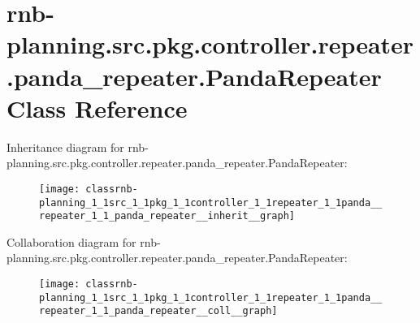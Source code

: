 \hypertarget{classrnb-planning_1_1src_1_1pkg_1_1controller_1_1repeater_1_1panda__repeater_1_1_panda_repeater}{}\section{rnb-\/planning.src.\+pkg.\+controller.\+repeater.\+panda\+\_\+repeater.\+Panda\+Repeater Class Reference}
\label{classrnb-planning_1_1src_1_1pkg_1_1controller_1_1repeater_1_1panda__repeater_1_1_panda_repeater}


Inheritance diagram for rnb-\/planning.src.\+pkg.\+controller.\+repeater.\+panda\+\_\+repeater.\+Panda\+Repeater\+:\nopagebreak
\begin{figure}[H]
\begin{center}
\leavevmode
\texttt{[image: classrnb-planning\_1\_1src\_1\_1pkg\_1\_1controller\_1\_1repeater\_1\_1panda\_\_repeater\_1\_1\_panda\_repeater\_\_inherit\_\_graph]}
\end{center}
\end{figure}


Collaboration diagram for rnb-\/planning.src.\+pkg.\+controller.\+repeater.\+panda\+\_\+repeater.\+Panda\+Repeater\+:\nopagebreak
\begin{figure}[H]
\begin{center}
\leavevmode
\texttt{[image: classrnb-planning\_1\_1src\_1\_1pkg\_1\_1controller\_1\_1repeater\_1\_1panda\_\_repeater\_1\_1\_panda\_repeater\_\_coll\_\_graph]}
\end{center}
\end{figure}
